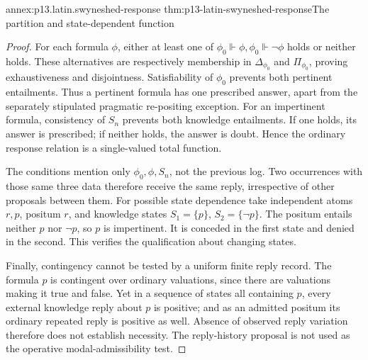 \begin{annexitem}{annex:p13.latin.swyneshed-response}
 {thm:p13-latin-swyneshed-response}{The partition and state-dependent function}
\begin{proof}
For each formula \(\phi\), either at least one of
\(\phi_0\Vdash\phi,\phi_0\Vdash\neg\phi\) holds or neither holds.
These alternatives are respectively membership in \(\Delta_{\phi_0}\)
and \(\Pi_{\phi_0}\), proving exhaustiveness and disjointness.
Satisfiability of \(\phi_0\) prevents both pertinent entailments.
Thus a pertinent formula has one prescribed answer, apart from the
separately stipulated pragmatic re-positing exception.
For an impertinent formula, consistency of \(S_n\) prevents both
knowledge entailments. If one holds, its answer is prescribed;
if neither holds, the answer is doubt. Hence the ordinary response
relation is a single-valued total function.

The conditions mention only \(\phi_0,\phi,S_n\), not the previous log.
Two occurrences with those same three data therefore receive the same
reply, irrespective of other proposals between them.
For possible state dependence take independent atoms \(r,p\),
positum \(r\), and knowledge states \(S_1=\{p\}\), \(S_2=\{\neg p\}\).
The positum entails neither \(p\) nor \(\neg p\), so \(p\) is impertinent.
It is conceded in the first state and denied in the second.
This verifies the qualification about changing states.

Finally, contingency cannot be tested by a uniform finite reply record.
The formula \(p\) is contingent over ordinary valuations, since there
are valuations making it true and false. Yet in a sequence of states
all containing \(p\), every external knowledge reply about \(p\) is
positive; and as an admitted positum its ordinary repeated reply is
positive as well. Absence of observed reply variation therefore does
not establish necessity. The reply-history proposal is not used as
the operative modal-admissibility test.
\end{proof}
\end{annexitem}

